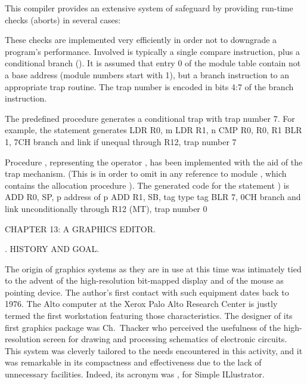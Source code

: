 This compiler provides an extensive system of safeguard by providing run-time checks (aborts) in several cases:


These checks are implemented very efficiently in order not to downgrade a program's performance. Involved is typically a single compare instruction, plus a conditional branch (). It is assumed that entry 0 of the module table contain not a base address (module numbers start with 1), but a branch instruction to an appropriate trap routine. The trap number is encoded in bits 4:7 of the branch instruction.

The predefined procedure  generates a conditional trap with trap number 7. For example, the statement  generates
\begintt
LDR R0, m
LDR R1, n
CMP R0, R0, R1
BLR 1, 7CH      branch and link if unequal through R12,
                trap number 7
\endtt

\noindent Procedure , representing the operator , has been implemented with the aid of the trap mechanism. (This is in order to omit in  any reference to module , which contains the allocation procedure ). The generated code for the statement ) is
\begintt
ADD R0, SP, p     address of p
ADD R1, SB, tag   type tag
BLR 7, 0CH        branch and link unconditionally through
                  R12 (MT), trap number 0
\endtt

\beginchapter CHAPTER 13: A GRAPHICS EDITOR.

. HISTORY AND GOAL.

The origin of graphics systems as they are in use at this time was intimately tied to the advent of the high-resolution bit-mapped display and of the mouse as pointing device. The author's first contact with such equipment dates back to 1976. The Alto computer at the Xerox Palo Alto Research Center is justly termed the first workstation featuring those characteristics. The designer of its first graphics package was Ch.~Thacker who perceived the usefulness of the high-resolution screen for drawing and processing schematics of electronic circuits. This system was cleverly tailored to the needs encountered in this activity, and it was remarkable in its compactness and effectiveness due to the lack of unnecessary facilities. Indeed, its acronym was , for Simple ILlustrator.

